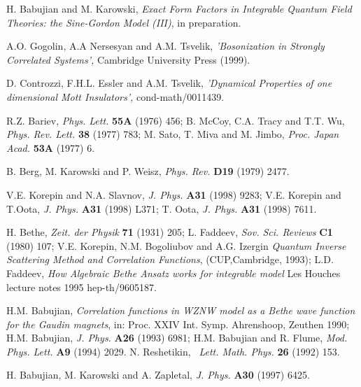 \documentclass[a4paper,12pt]{article}
\begin{document}
\begin{thebibliography}{99}
  H. Babujian and M. Karowski, \emph{Exact Form Factors in
Integrable Quantum Field Theories: the Sine-Gordon Model (III)}, in
preparation.

  A.O. Gogolin, A.A Nersesyan and A.M. Tsvelik, \emph{%
'Bosonization in Strongly Correlated Systems', }Cambridge University Press
(1999).

  D. Controzzi, F.H.L. Essler and A.M. Tsvelik, \emph{%
'Dynamical Properties of one dimensional Mott Insulators', }%
cond-math/0011439.

  R.Z. Bariev, {\em Phys. Lett.} {\bf55A} (1976) 456;\newline
B. McCoy, C.A. Tracy and T.T. Wu, {\em Phys. Rev. Lett.} {\bf 38} (1977) 783;
\newline
M. Sato, T. Miva and M. Jimbo, {\em Proc. Japan Acad.} {\bf 53A} (1977) 6.

  B. Berg, M. Karowski and P. Weisz, \emph{Phys. Rev.} \textbf{%
D19} (1979) 2477.

  V.E. Korepin and N.A. Slavnov, \emph{J. Phys.} \textbf{A31%
} (1998) 9283;\newline
V.E. Korepin and T.Oota, \emph{J. Phys.} \textbf{A31} (1998) L371;\newline
T. Oota, \emph{J. Phys.} \textbf{A31} (1998) 7611.

  H. Bethe, \emph{Zeit. der Physik} \textbf{71 }(1931) 205;%
\newline
L. Faddeev, \emph{Sov. Sci. Reviews} \textbf{C1} (1980) 107; \newline
V.E. Korepin, N.M. Bogoliubov and A.G. Izergin \emph{Quantum Inverse
Scattering Method and Correlation Functions}, (CUP,Cambridge, 1993); \newline
L.D. Faddeev, \emph{How Algebraic Bethe Ansatz works for integrable model}
Les Houches lecture notes 1995 hep-th/9605187.

  H.M. Babujian, \emph{Correlation functions in WZNW model as
a Bethe wave function for the Gaudin magnets}, in: Proc. XXIV Int. Symp.
Ahrenshoop, Zeuthen 1990;\newline
H.M. Babujian, \emph{J. Phys.} \textbf{A26} (1993) 6981; H.M. Babujian and
R. Flume, \emph{Mod. Phys. Lett.} \textbf{A9} (1994) 2029.\newline
N. Reshetikin, \emph{\ Lett. Math. Phys. } \textbf{26} (1992) 153.

  H. Babujian, M. Karowski and A. Zapletal, \emph{J. Phys.} 
\textbf{A30} (1997) 6425.


\end{thebibliography}
\end{document}
